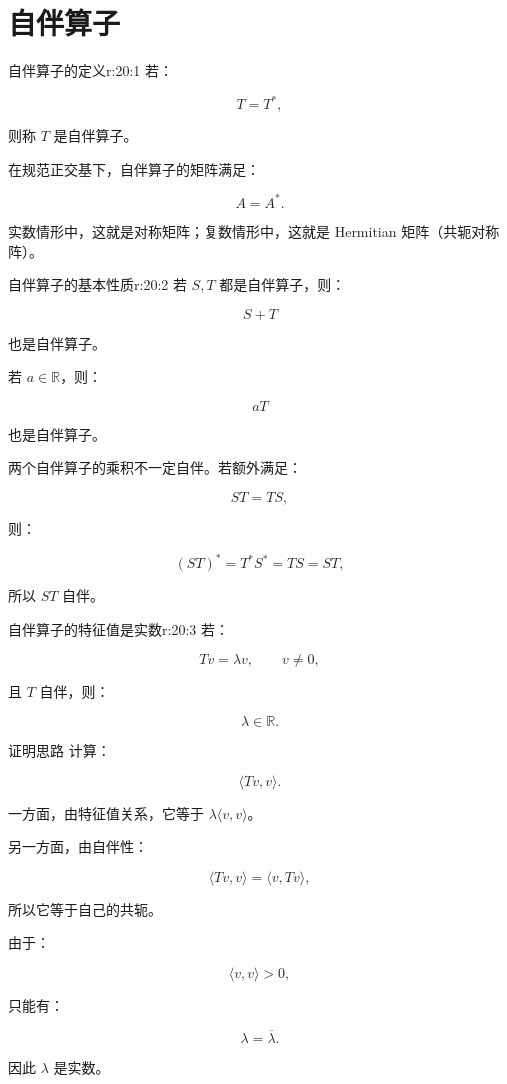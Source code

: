 
\chapter{自伴算子}


\begin{jdefn}{自伴算子的定义}{r:20:1}
若：

\[
T=T^*,
\]

则称 $T$ 是自伴算子。

在规范正交基下，自伴算子的矩阵满足：

\[
A=A^*.
\]

实数情形中，这就是对称矩阵；复数情形中，这就是 Hermitian 矩阵（共轭对称阵）。
\end{jdefn}

\begin{jprop}{自伴算子的基本性质}{r:20:2}
若 $S,T$ 都是自伴算子，则：

\[
S+T
\]

也是自伴算子。

若 $a\in\mathbb R$，则：

\[
aT
\]

也是自伴算子。

两个自伴算子的乘积不一定自伴。若额外满足：

\[
ST=TS,
\]

则：

\[
(ST)^*=T^*S^*=TS=ST,
\]

所以 $ST$ 自伴。
\end{jprop}

\begin{jprop}{自伴算子的特征值是实数}{r:20:3}
若：

\[
Tv=\lambda v,
\qquad
v\ne0,
\]

且 $T$ 自伴，则：

\[
\lambda\in\mathbb R.
\]
\end{jprop}

\begin{jproof}{证明思路}
计算：

\[
\langle Tv,v\rangle.
\]

一方面，由特征值关系，它等于 $\lambda\langle v,v\rangle$。

另一方面，由自伴性：

\[
\langle Tv,v\rangle
=
\langle v,Tv\rangle,
\]

所以它等于自己的共轭。

由于：

\[
\langle v,v\rangle>0,
\]

只能有：

\[
\lambda=\overline{\lambda}.
\]

因此 $\lambda$ 是实数。
\end{jproof}

